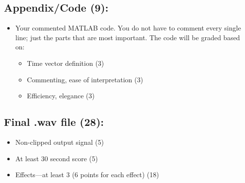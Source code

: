 \documentclass[12pt]{article}
\begin{document}
\subsection{Appendix/Code (9): } 
\begin{itemize}[nosep]
\item Your commented MATLAB code. You do not have to comment every single line; just the parts that are most important. The code will be graded based on: 
 \begin{itemize}[nosep]
\item Time vector definition (3) 
\item Commenting, ease of interpretation (3) 
\item Efficiency, elegance (3) 
\end{itemize}
\end{itemize}

\subsection{Final .wav file (28):}
\begin{itemize}[nosep]
\item Non-clipped output signal (5) 
\item At least 30 second score (5) 
\item Effects—at least 3 (6 points for each effect) (18)
\end{itemize}

\clearpage
\end{document}
